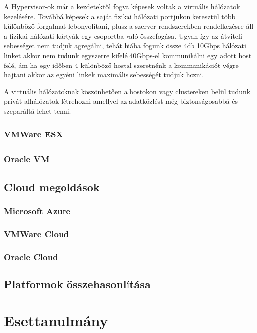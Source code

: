 \documentclass[12pt,oneside,justify]{book}
\begin{document}
A Hypervisor-ok már a kezdetektől fogva képesek voltak a virtuális hálózatok kezelésére. Továbbá képesek a saját fizikai hálózati portjukon keresztül több különböző forgalmat lebonyolítani, plusz a szerver rendszerekben rendelkezésre áll a fizikai hálózati kártyák egy csoportba való összefogása. Ugyan így az átviteli sebességet nem tudjuk agregálni, tehát hiába fogunk össze 4db 10Gbps hálózati linket akkor nem tudunk egyszerre kifelé 40Gbps-el kommunikálni egy adott host felé, ám ha egy időben 4 különböző hostal szeretnénk a kommunikációt végre hajtani akkor az egyéni linkek maximális sebességét tudjuk hozni. 

A virtuális hálózatoknak köszönhetően a hostokon vagy clustereken belül tudunk privát alhálózatok létrehozni amellyel az adatközlést még biztonságosabbá és szeparáltá lehet tenni.

\subsection{VMWare ESX \textsuperscript{\textregistered}}


\subsection{Oracle\textsuperscript{\textregistered} VM}


\section{Cloud megoldások}
\subsection{Microsoft Azure}


\subsection{VMWare Cloud}


\subsection{Oracle Cloud}


\section{Platformok összehasonlítása}


\chapter{Esettanulmány}
\end{document}
